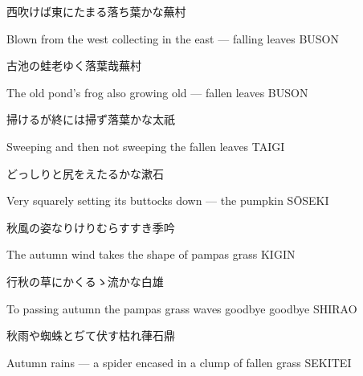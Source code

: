 \begin{haiku}
    {\FH 西吹けば東にたまる落ち葉かな}\hfill{\FH 蕪村}

    \vin{} Blown from the west
    \vin{} \vin{} collecting in the east ---
    \vin{} \vin{} \vin{} falling leaves \hspace{\fill} BUSON
\end{haiku}

\begin{haiku}
    {\FH 古池の蛙老ゆく落葉哉}\hfill{\FH 蕪村}

    \vin{} The old pond's
    \vin{} \vin{} frog also growing old ---
    \vin{} \vin{} \vin{} fallen leaves \hspace{\fill} BUSON
\end{haiku}

\begin{haiku}
    {\FH 掃けるが終には掃ず落葉かな}\hfill{\FH 太祇}

    \vin{} Sweeping
    \vin{} \vin{} and then not sweeping
    \vin{} \vin{} \vin{} the fallen leaves \hspace{\fill} TAIGI
\end{haiku}

\begin{haiku}
    {\FH どっしりと尻をえたるかな}\hfill{\FH 漱石}

    \vin{} Very squarely
    \vin{} \vin{} setting its buttocks down ---
    \vin{} \vin{} \vin{} the pumpkin \hspace{\fill} S\={O}SEKI
\end{haiku}

\begin{haiku}
    {\FH 秋風の姿なりけりむらすすき}\hfill{\FH 季吟}

    \vin{} The autumn wind
    \vin{} \vin{} takes the shape
    \vin{} \vin{} \vin{} of pampas grass \hspace{\fill} KIGIN
\end{haiku}

\begin{haiku}
    {\FH 行秋の草にかくるゝ流かな}\hfill{\FH 白雄}

    \vin{} To passing autumn
    \vin{} \vin{} the pampas grass waves
    \vin{} \vin{} \vin{} goodbye goodbye \hspace{\fill} SHIRAO
\end{haiku}

\begin{haiku}
    {\FH 秋雨や蜘蛛とぢて伏す枯れ葎}\hfill{\FH 石鼎}

    \vin{} Autumn rains ---
    \vin{} \vin{} a spider encased in
    \vin{} \vin{} \vin{} a clump of fallen grass \hspace{\fill} SEKITEI
\end{haiku}

